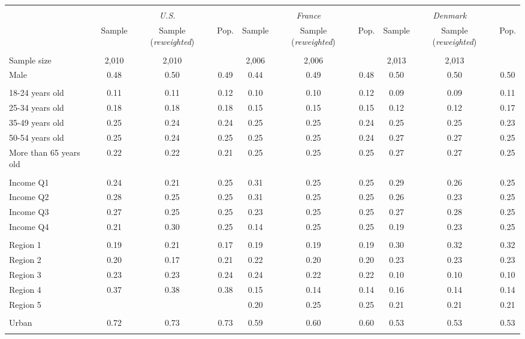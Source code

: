 \begin{tabular}{lccccccccc}
\toprule
\hline \\[-1.8ex]
\multicolumn{1}{c}{\em{ }} & \multicolumn{3}{c}{\em{U.S.}} & \multicolumn{3}{c}{\em{France}} & \multicolumn{3}{c}{\em{Denmark}}\\
\cmidrule(l{3pt}r{3pt}){2-4} \cmidrule(l{3pt}r{3pt}){5-7} \cmidrule(l{3pt}r{3pt}){8-10}
\noalign{\smallskip}  & Sample & Sample (\textit{reweighted}) & Pop. & Sample & Sample (\textit{reweighted}) & Pop. & Sample & Sample (\textit{reweighted}) & Pop. \\
\hline \\[-1.8ex] 
Sample size & 2,010 & 2,010 & & 2,006 & 2,006 &  & 2,013 & 2,013 & \\
\noalign{\smallskip}\hline \noalign{\smallskip}Male & 0.48 & 0.50 & 0.49 & 0.44 & 0.49 & 0.48 & 0.50 & 0.50 & 0.50\\ 
\\
18-24 years old & 0.11 & 0.11 & 0.12 & 0.10 & 0.10 & 0.12 & 0.09 & 0.09 & 0.11\\
25-34 years old & 0.18 & 0.18 & 0.18 & 0.15 & 0.15 & 0.15 & 0.12 & 0.12 & 0.17\\
35-49 years old & 0.25 & 0.24 & 0.24 & 0.25 & 0.25 & 0.24 & 0.25 & 0.25 & 0.23\\
50-54 years old & 0.25 & 0.24 & 0.25 & 0.25 & 0.25 & 0.24 & 0.27 & 0.27 & 0.25\\
More than 65 years old & 0.22 & 0.22 & 0.21 & 0.25 & 0.25 & 0.25 & 0.27 & 0.27 & 0.25\\ 
\\
Income Q1 & 0.24 & 0.21 & 0.25 & 0.31 & 0.25 & 0.25 & 0.29 & 0.26 & 0.25\\
Income Q2 & 0.28 & 0.25 & 0.25 & 0.31 & 0.25 & 0.25 & 0.26 & 0.23 & 0.25\\
Income Q3 & 0.27 & 0.25 & 0.25 & 0.23 & 0.25 & 0.25 & 0.27 & 0.28 & 0.25\\
Income Q4 & 0.21 & 0.30 & 0.25 & 0.14 & 0.25 & 0.25 & 0.19 & 0.23 & 0.25\\
\\
Region 1 & 0.19 & 0.21 & 0.17 & 0.19 & 0.19 & 0.19 & 0.30 & 0.32 & 0.32\\
Region 2 & 0.20 & 0.17 & 0.21 & 0.22 & 0.20 & 0.20 & 0.23 & 0.23 & 0.23\\
Region 3 & 0.23 & 0.23 & 0.24 & 0.24 & 0.22 & 0.22 & 0.10 & 0.10 & 0.10\\
Region 4 & 0.37 & 0.38 & 0.38 & 0.15 & 0.14 & 0.14 & 0.16 & 0.14 & 0.14\\
Region 5 & &  &  & 0.20 & 0.25 & 0.25 & 0.21 & 0.21 & 0.21\\
\\
Urban & 0.72 & 0.73 & 0.73 & 0.59 & 0.60 & 0.60 & 0.53 & 0.53 & 0.53\\
\\
\bottomrule
\end{tabular}